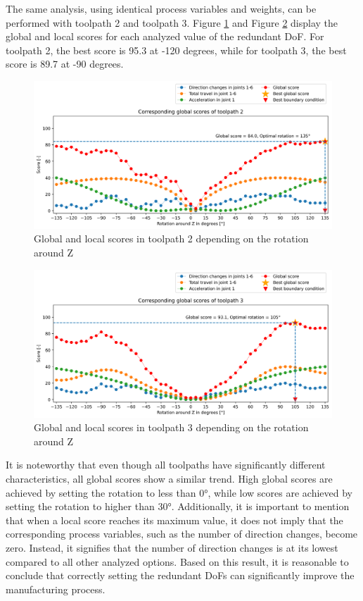The same analysis, using identical process variables and weights, can be performed with toolpath 2 and toolpath 3. Figure \ref{TP2_combi} and Figure \ref{TP3_combi} display the global and local scores for each analyzed value of the redundant \acrshort{DoF}. For toolpath 2, the best score is 95.3 at -120 degrees, while for toolpath 3, the best score is 89.7 at -90 degrees.
\newpage

\begin{figure}[H]
\centerline{\includegraphics[width=1\textwidth]{figures/best_c_2_combi.png}}
\caption{Global and local scores in toolpath 2 depending on the rotation around Z}
\label{TP2_combi}
\end{figure}
\begin{figure}[H]
\centerline{\includegraphics[width=1\textwidth]{figures/best_c_3_combi.png}}
\caption{Global and local scores in toolpath 3 depending on the rotation around Z}
\label{TP3_combi}
\end{figure}

It is noteworthy that even though all toolpaths have significantly different characteristics, all global scores show a similar trend. High global scores are achieved by setting the rotation to less than 0°, while low scores are achieved by setting the rotation to higher than 30°. Additionally, it is important to mention that when a local score reaches its maximum value, it does not imply that the corresponding process variables, such as the number of direction changes, become zero. Instead, it signifies that the number of direction changes is at its lowest compared to all other analyzed options.\newline
Based on this result, it is reasonable to conclude that correctly setting the redundant \acrshort{DoF}s can significantly improve the manufacturing process.
\newpage

